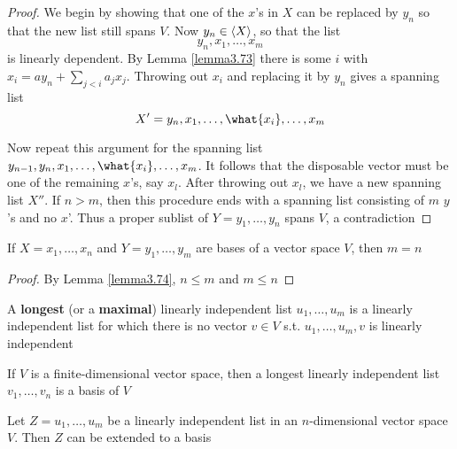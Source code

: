 \documentclass[11pt]{article}
\begin{document}
\begin{proof}
We begin by showing that one of the \(x\)'s in \(X\) can be replaced by
\(y_n\) so that the new list still spans \(V\). Now \(y_n\in\langle X\rangle\), so
that the list
\begin{equation*}
y_n,x_1,\dots,x_m
\end{equation*}
is linearly dependent. By Lemma \ref{lemma3.73} there is some \(i\) with 
\(x_i=ay_n+\sum_{j<i}a_jx_j\). Throwing out \(x_i\) and replacing it by
\(y_n\) gives a spanning list 
\begin{equation*}
X'=y_n,x_1,\dots,\what{x_i},\dots,x_m
\end{equation*}

Now repeat this argument for the spanning list 
\(y_{n-1},y_n,x_1,\dots,\what{x_i},\dots,x_m\). It follows that the
disposable vector must be one of the remaining \(x\)'s, say \(x_l\). After
throwing out \(x_l\), we have a new spanning list \(X''\). If \(n>m\), then
this procedure ends with a spanning list consisting of \(m\) \(y\)'s and no
\(x\)'. Thus a proper sublist of \(Y=y_1,\dots,y_n\) spans \(V\), a contradiction
\end{proof}

\begin{theorem}
If \(X=x_1,\dots,x_n\) and \(Y=y_1,\dots,y_m\) are bases of a vector space
\(V\), then \(m=n\)
\end{theorem}

\begin{proof}
By Lemma \ref{lemma3.74}, \(n\le m\) and \(m\le n\)
\end{proof}

\begin{definition}[]
A \textbf{longest} (or a \textbf{maximal}) linearly independent list \(u_1,\dots,u_m\) is a
linearly independent list for which there is no vector \(v\in V\) s.t. 
\(u_1,\dots,u_m,v\) is linearly independent
\end{definition}

\begin{lemma}[]
If \(V\) is a finite-dimensional vector space, then a longest linearly
independent list \(v_1,\dots,v_n\) is a basis of \(V\)
\end{lemma}

\begin{proposition}[]
Let \(Z=u_1,\dots,u_m\) be a linearly independent list in an
\(n\)-dimensional vector space \(V\). Then \(Z\) can be extended to a basis
\end{proposition}
\end{document}
